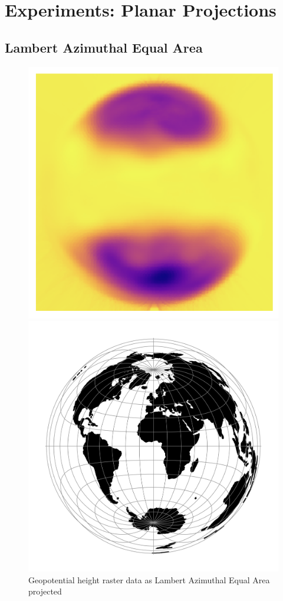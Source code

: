 
\section{Experiments: Planar Projections}

\subsection{Lambert Azimuthal Equal Area}
\begin{figure}[H]
    \centering
    \begin{minipage}{0.30\textwidth}
        \centering
        \includegraphics[width=0.9\linewidth]{figures/chapter-8/geopoth_laea.png}
        \caption{ Geopotential height raster data as Lambert Azimuthal Equal Area projected}
        \label{fig:laea_geopoth_raster}
    \end{minipage}\hfill
    \begin{minipage}{0.30\textwidth}
        \centering
        \includegraphics[width=0.9\linewidth]{figures/chapter-8/laea.png}

\end{minipage}
\end{figure}
